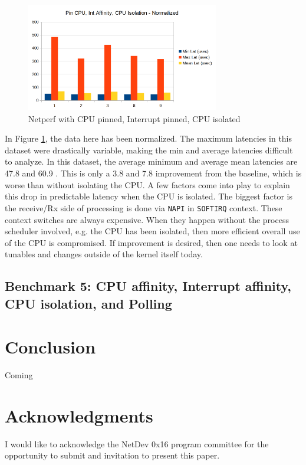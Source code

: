\documentclass[letterpaper]{article}
\begin{document}
{{\begin{figure}[h]
\includegraphics[width=3.31in]{netperf-cpu-pin-int-affinity-cpu-isol-normalized.png}
\caption{Netperf with CPU pinned, Interrupt pinned, CPU isolated}
\label{netperf-cpu-pin-int-affinity-cpu-isol-normalized}
\end{figure}

In Figure \ref{netperf-cpu-pin-int-affinity-cpu-isol-normalized}, the data here has been normalized. The maximum latencies in this dataset were drastically variable, making the min and average latencies difficult to analyze.  In this dataset, the average minimum and average mean latencies are 47.8  and 60.9 .  This is only a 3.8  and 7.8  improvement from the baseline, which is worse than without isolating the CPU.
\newline
\newline
A few factors come into play to explain this drop in predictable latency when the CPU is isolated. The biggest factor is the receive/Rx side of processing is done via {\small \texttt{NAPI}} in {\small \texttt{SOFTIRQ}} context. These context switches are always expensive.  When they happen without the process scheduler involved, e.g. the CPU has been isolated, then more efficient overall use of the CPU is compromised. If improvement is desired, then one needs to look at tunables and changes outside of the kernel itself today.

\subsection{Benchmark 5: CPU affinity, Interrupt affinity, CPU isolation, and Polling}

\section{Conclusion}
Coming

\section{Acknowledgments}
I would like to acknowledge the NetDev 0x16 program committee for the opportunity to submit and invitation to present this paper.

}}
\end{document}
